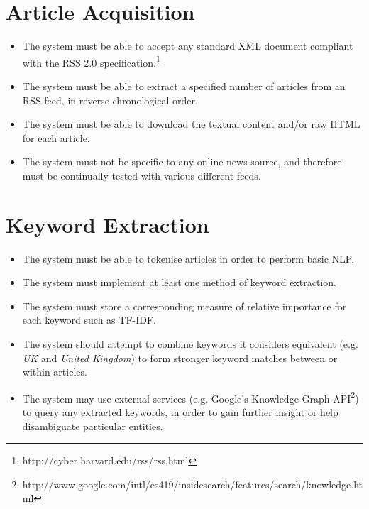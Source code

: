 \section{Article Acquisition}
\begin{itemize}
	\item The system must be able to accept any standard XML document compliant with the RSS 2.0 specification.\footnote{http://cyber.harvard.edu/rss/rss.html}
	\item The system must be able to extract a specified number of articles from an RSS feed, in reverse chronological order.
	\item The system must be able to download the textual content and/or raw HTML for each article.
	\item The system must not be specific to any online news source, and therefore must be continually tested with various different feeds.
\end{itemize}
\section{Keyword Extraction}
\begin{itemize}
	\item The system must be able to tokenise articles in order to perform basic NLP.
	\item The system must implement at least one method of keyword extraction.
	\item The system must store a corresponding measure of relative importance for each keyword such as TF-IDF\citep{tfidf}.
	\item The system should attempt to combine keywords it considers equivalent (e.g. \textit{UK} and \textit{United Kingdom}) to form stronger keyword matches between or within articles.
	\item The system may use external services (e.g. Google's Knowledge Graph API\footnote{http://www.google.com/intl/es419/insidesearch/features/search/knowledge.html}) to query any extracted keywords, in order to gain further insight or help disambiguate particular entities.
\end{itemize}
